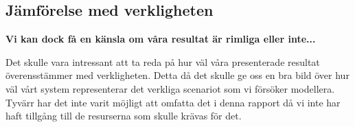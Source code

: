 \subsection{Jämförelse med verkligheten}
\textbf{Vi kan dock få en känsla om våra resultat är rimliga eller inte...}

Det skulle vara intressant att ta reda på hur väl våra presenterade resultat överensstämmer med verkligheten. Detta då det skulle ge oss en bra bild över hur väl vårt system representerar det verkliga scenariot som vi försöker modellera. Tyvärr har det inte varit möjligt att omfatta det i denna rapport då vi inte har haft tillgång till de resurserna som skulle krävas för det.
